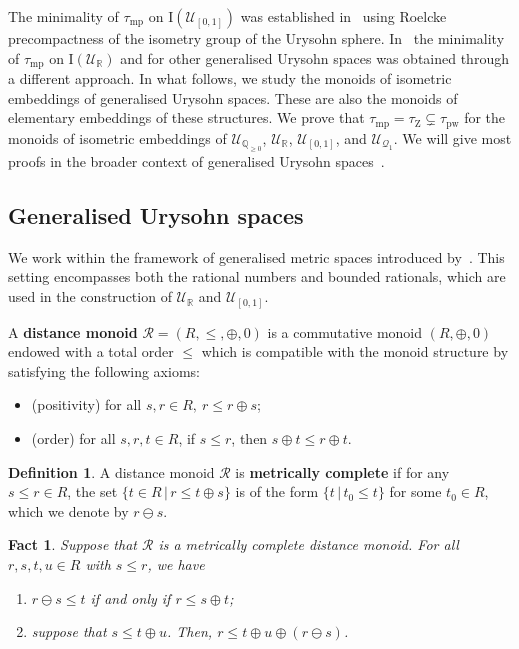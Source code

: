 \documentclass{article}
\newtheorem{fact}[theorem]{Fact}
\theoremstyle{remark}
\theoremstyle{definition}
\newtheorem{definition}[theorem]{Definition}
\newcommand{\U}[0]{\mathbb{U}}
\renewcommand{\U}[0]{\mathcal{U}}
\newcommand{\pw}[0]{\tau_{\mathrm{pw}}}
\newcommand{\zar}[0]{\tau_{\mathrm{Z}}}
\newcommand{\mpw}[0]{\tau_{\mathrm{mp}}}
\renewcommand\leq{\leqslant}
\renewcommand\geq{\geqslant}
\newcommand{\rr}[0]{\mathcal{R}}
\begin{document}
{{{{{The minimality of $\mpw$ on $\mathrm{I}(\U_{[0,1]})$  was established in~\cite{uspenskij2008subgroups} {using Roelcke precompactness of the isometry group of the Urysohn sphere.}
In~\cite{gonzalesghadernezhad} the minimality of $\mpw$ on $\mathrm{I}(\U_{\mathbb R})$ and for other generalised Urysohn spaces was obtained through a different approach. In what follows, we study the monoids of isometric embeddings of generalised Urysohn spaces. These are also the monoids of elementary embeddings of these structures. We prove that $\mpw=\zar\subsetneq\pw$ for the monoids of isometric embeddings of $\U_{\mathbb Q_{\geq 0}}$, $\U_{\mathbb R}$, $\U_{[0,1]}$, and $\U_{\mathcal{Q}_1}$. We will give most proofs in the broader context of generalised Urysohn spaces~\cite{con15}.

\subsection{Generalised Urysohn spaces}


We work within the framework of generalised metric spaces introduced by~\cite{con15}. This setting encompasses both the rational numbers and bounded rationals, which are used in the construction of  $\U_{\mathbb R}$  and $\U_{[0,1]}$.


A {\bf distance monoid} $\rr=(R,\leq,\oplus,0)$ is a commutative monoid $(R, \oplus, 0)$ endowed with a total order $\leq$ which is compatible with the monoid structure by satisfying the following axioms: 

\begin{itemize}
	\item (positivity) for all  $s, r\in R, \ r\leq r\oplus s $;
	\item (order) for all $s, r, t\in R$, if $s\leq r$, then $s\oplus t\leq r\oplus t$.
\end{itemize}
	

\begin{definition} A distance monoid $\rr$ is \textbf{metrically complete} if for any $s\leq r\in R$, the set $\{t\in R\,|\,r\leq t\oplus s\}$ is of the form $\{t\,|\,t_{0}\leq t\}$ for some $t_{0}\in R$, which we denote by $r\ominus s$.
\end{definition}

\begin{fact}\label{fact:ominus} Suppose that $\rr$ is a metrically complete distance monoid. For all $r,s,t,u\in R$ with $s\leq r$, we have
\begin{enumerate}
    \item $r\ominus s\leq t$ if and only if $r\leq s\oplus t$;
    \item suppose that $s\leq t\oplus u$. Then, $r\leq t\oplus u\oplus (r\ominus s)$.
   

\end{enumerate}
\end{fact}}}}}}
\end{document}
